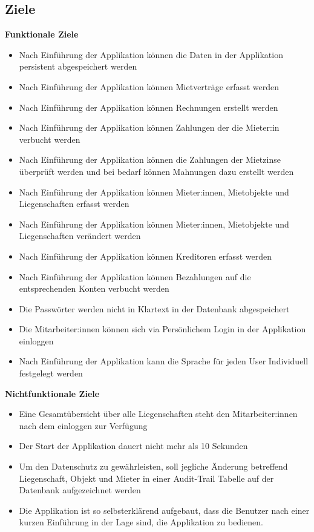 \subsection{Ziele}
\textbf{Funktionale Ziele}
\begin{itemize}
  \item Nach Einführung der Applikation können die Daten in der Applikation persistent abgespeichert werden
  \item Nach Einführung der Applikation können Mietverträge erfasst werden
  \item Nach Einführung der Applikation können Rechnungen erstellt werden
  \item Nach Einführung der Applikation können Zahlungen der die Mieter:in verbucht werden
  \item Nach Einführung der Applikation können die Zahlungen der Mietzinse überprüft werden und bei bedarf können Mahnungen dazu erstellt werden
  \item Nach Einführung der Applikation können Mieter:innen, Mietobjekte und Liegenschaften erfasst werden
  \item Nach Einführung der Applikation können Mieter:innen, Mietobjekte und Liegenschaften verändert werden
  \item Nach Einführung der Applikation können Kreditoren erfasst werden
  \item Nach Einführung der Applikation können Bezahlungen auf die entsprechenden Konten verbucht werden
  \item Die Passwörter werden nicht in Klartext in der Datenbank abgespeichert
  \item Die Mitarbeiter:innen können sich via Persönlichem Login in der Applikation einloggen
  \item Nach Einführung der Applikation kann die Sprache für jeden User Individuell festgelegt werden
\end{itemize}

\textbf{Nichtfunktionale Ziele}
\begin{itemize}
  \item Eine Gesamtübersicht über alle Liegenschaften steht den Mitarbeiter:innen nach dem einloggen zur Verfügung
  \item Der Start der Applikation dauert nicht mehr als 10 Sekunden
  \item Um den Datenschutz zu gewährleisten, soll jegliche Änderung betreffend Liegenschaft, Objekt und Mieter in einer Audit-Trail Tabelle auf der Datenbank aufgezeichnet werden
  \item Die Applikation ist so selbsterklärend aufgebaut, dass die Benutzer nach einer kurzen Einführung in der Lage sind, die Applikation zu bedienen.
\end{itemize}


